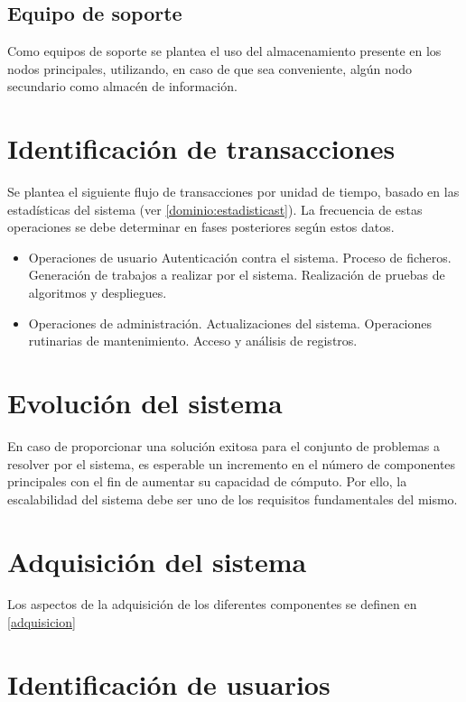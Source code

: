 \subsection{Equipo de soporte}

Como equipos de soporte se plantea el uso del almacenamiento presente en los nodos principales, utilizando, en caso de que sea conveniente, algún nodo secundario como almacén de información.

\section{Identificación de transacciones}

Se plantea el siguiente flujo de transacciones por unidad de tiempo, basado en las estadísticas del sistema (ver \ref{dominio:estadisticast}). La frecuencia de estas operaciones se debe determinar en fases posteriores según estos datos.

\begin{itemize}
\item Operaciones de usuario
\subitem Autenticación contra el sistema.
\subitem Proceso de ficheros.
\subitem Generación de trabajos a realizar por el sistema.
\subitem Realización de pruebas de algoritmos y despliegues.
\item Operaciones de administración.
\subitem Actualizaciones del sistema.
\subitem Operaciones rutinarias de mantenimiento.
\subitem Acceso y análisis de registros.
\end{itemize}

\section{Evolución del sistema}

En caso de proporcionar una solución exitosa para el conjunto de problemas a resolver por el sistema, es esperable un incremento en el número de componentes principales con el fin de aumentar su capacidad de cómputo. Por ello, la escalabilidad del sistema debe ser uno de los requisitos fundamentales del mismo.

\section{Adquisición del sistema}

Los aspectos de la adquisición de los diferentes componentes se definen en \ref{adquisicion}

\section{Identificación de usuarios}

